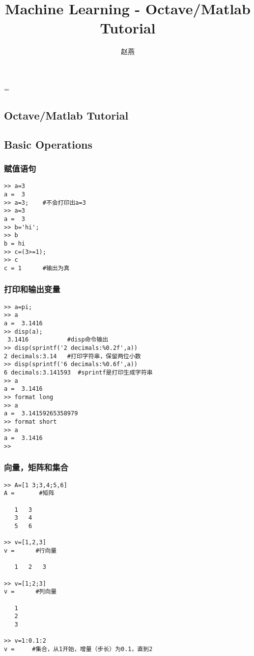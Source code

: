 \documentclass{article}
\title{Machine Learning - Octave/Matlab Tutorial}
\author{赵燕}
\date{}
\begin{document}
 
\hfuzz=\maxdimen
{}
\begin{CJK}{UTF8}{gbsn} 
\maketitle
\renewcommand\contentsname{目录}
\renewcommand\figurename{图}
\tableofcontents
\newpage

\section{Octave/Matlab Tutorial}
\subsection{Basic Operations}
\subsubsection{赋值语句}
\begin{verbatim}
>> a=3
a =  3
>> a=3;    #不会打印出a=3
>> a=3
a =  3
>> b='hi';
>> b
b = hi
>> c=(3>=1);
>> c
c = 1      #输出为真
\end{verbatim}
\subsubsection{打印和输出变量}
\begin{verbatim}
>> a=pi;
>> a
a =  3.1416
>> disp(a);
 3.1416           #disp命令输出
>> disp(sprintf('2 decimals:%0.2f',a))
2 decimals:3.14   #打印字符串，保留两位小数
>> disp(sprintf('6 decimals:%0.6f',a))
6 decimals:3.141593  #sprintf是打印生成字符串
>> a
a =  3.1416
>> format long
>> a
a =  3.14159265358979
>> format short
>> a
a =  3.1416
>>
\end{verbatim}
\subsubsection{向量，矩阵和集合}
\begin{verbatim}
>> A=[1 3;3,4;5,6]
A =       #矩阵

   1   3
   3   4
   5   6

>> v=[1,2,3]
v =      #行向量

   1   2   3

>> v=[1;2;3]
v =      #列向量

   1
   2
   3

>> v=1:0.1:2
v =     #集合，从1开始，增量（步长）为0.1，直到2


\end{verbatim}
\end{CJK}
\end{document}
